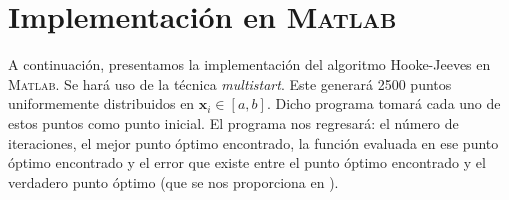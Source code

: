 \section{Implementación en \textsc{Matlab}}

A continuación, presentamos la implementación del algoritmo Hooke-Jeeves en \textsc{Matlab}. Se hará uso de la técnica \emph{multistart}. Este generará 2500 puntos uniformemente distribuidos en $\mathbf{x}_i \in [a, b]$. Dicho programa tomará cada uno de estos puntos como punto inicial. El programa nos regresará: el número de iteraciones, el mejor punto óptimo encontrado, la función evaluada en ese punto óptimo encontrado y el error que existe entre el punto óptimo encontrado y el verdadero punto óptimo (que se nos proporciona en \cite{sfuoptimization}).

\newpage
\label{program-JH}
